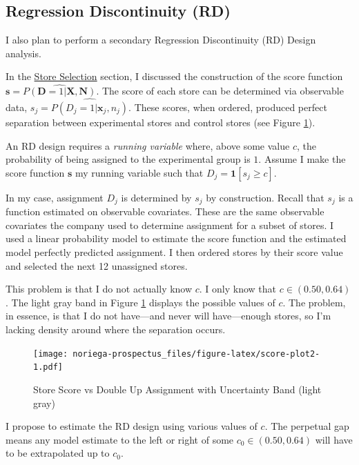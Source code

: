 \documentclass[12pt,letterpaperpaper,]{book}
\begin{document}
\subsection*{Regression Discontinuity
(RD)}\label{regression-discontinuity-rd}

I also plan to perform a secondary Regression Discontinuity (RD) Design
analysis.

In the \protect\hyperlink{store-selection-1}{Store Selection} section, I
discussed the construction of the score function
\(\bm{s} = \widehat{P(\mathbf{D} = 1 | \bm{X}, \bm{N})}\). The score of
each store can be determined via observable data,
\(s_{j} = \widehat{P(D_{j} = 1|\bm{x}_{j}, n_{j})}\). These scores, when
ordered, produced perfect separation between experimental stores and
control stores (see Figure \ref{fig:score-plot2}).

An RD design requires a \emph{running variable} where, above some value
\(c\), the probability of being assigned to the experimental group is
\(1\). Assume I make the score function \(\bm{s}\) my running variable
such that \(D_{j} = \bm{1}[s_{j} \ge c]\).

In my case, assignment \(D_{j}\) is determined by \(s_{j}\) by
construction. Recall that \(s_{j}\) is a function estimated on
observable covariates. These are the same observable covariates the
company used to determine assignment for a subset of stores. I used a
linear probability model to estimate the score function and the
estimated model perfectly predicted assignment. I then ordered stores by
their score value and selected the next 12 unassigned stores.

This problem is that I do not actually know \(c\). I only know that
\(c \in (0.50, 0.64)\). The light gray band in Figure
\ref{fig:score-plot2} displays the possible values of \(c\). The
problem, in essence, is that I do not have---and never will
have---enough stores, so I'm lacking density around where the separation
occurs.

\begin{figure}
\centering
\texttt{[image: noriega-prospectus\_files/figure-latex/score-plot2-1.pdf]}
\caption{\label{fig:score-plot2}Store Score vs Double Up Assignment with
Uncertainty Band (light gray)}
\end{figure}

I propose to estimate the RD design using various values of \(c\). The
perpetual gap means any model estimate to the left or right of some
\(c_0 \in (0.50, 0.64)\) will have to be extrapolated up to \(c_0\).
\end{document}
